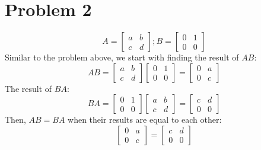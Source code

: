\documentclass[10pt]{article}
\begin{document}
\section*{Problem 2}
\begin{equation*}
    A = 
    \begin{bmatrix}
        a & b \\
        c & d
    \end{bmatrix};
    B = 
    \begin{bmatrix}
        0 & 1 \\
        0 & 0
    \end{bmatrix}
\end{equation*}
\noindent Similar to the problem above, we start with finding the result of $AB$:
\begin{equation*}
    AB = 
    \begin{bmatrix}
        a & b \\
        c & d
    \end{bmatrix}
    \begin{bmatrix}
        0 & 1 \\
        0 & 0
    \end{bmatrix}
    =
    \begin{bmatrix}
        0 & a \\
        0 & c
    \end{bmatrix}
\end{equation*}
\noindent The result of $BA$:
\begin{equation*}
    BA = 
    \begin{bmatrix}
        0 & 1 \\
        0 & 0
    \end{bmatrix}
    \begin{bmatrix}
        a & b \\
        c & d
    \end{bmatrix}
    =
    \begin{bmatrix}
        c & d \\
        0 & 0
    \end{bmatrix}
\end{equation*}
\noindent Then, $AB=BA$ when their results are equal to each other:
\begin{equation*}
    \begin{bmatrix}
        0 & a \\
        0 & c
    \end{bmatrix}
    =
    \begin{bmatrix}
        c & d \\
        0 & 0
    \end{bmatrix}
\end{equation*}
\end{document}
